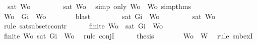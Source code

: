 \begin{isabellebody}
\ {\isachardoublequoteopen}{\isasymnot}\ {\isacharparenleft}sat\ Wo{\isacharprime}{\isacharparenright}{\isachardoublequoteclose}\isanewline
\ \ \ \ \ \ \isamarkupfalse%
\ {\isacartoucheopen}{\isasymnot}\ sat\ Wo{\isacartoucheclose}\ \isamarkupfalse%
\ {\isacharparenleft}simp\ only{\isacharcolon}\ {\isacartoucheopen}Wo\ {\isacharequal}\ Wo{\isacharprime}{\isacartoucheclose}\ simp{\isacharunderscore}thms{\isacharparenleft}{}{\isacharparenright}{\isacharparenright}\isanewline
\ \ \ \ \isamarkupfalse%
\ {\isachardoublequoteopen}Wo{\isacharprime}\ {\isasymsubseteq}\ {\isacharbraceleft}Gi{\isacharbraceright}\ {\isasymunion}\ Wo{\isacharprime}{\isachardoublequoteclose}\isanewline
\ \ \ \ \ \ \isamarkupfalse%
\ blast\isanewline
\ \ \ \ \isamarkupfalse%
\ \isamarkupfalse%
\ {\isachardoublequoteopen}{\isasymnot}\ {\isacharparenleft}sat\ {\isacharparenleft}{\isacharbraceleft}Gi{\isacharbraceright}\ {\isasymunion}\ Wo{\isacharprime}{\isacharparenright}{\isacharparenright}{\isachardoublequoteclose}\isanewline
\ \ \ \ \ \ \isamarkupfalse%
\ {\isacartoucheopen}{\isasymnot}\ {\isacharparenleft}sat\ Wo{\isacharprime}{\isacharparenright}{\isacartoucheclose}\ \isamarkupfalse%
\ {\isacharparenleft}rule\ sat{\isacharunderscore}subset{\isacharunderscore}ccontr{\isacharparenright}\isanewline
\ \ \ \ \isamarkupfalse%
\ {\isachardoublequoteopen}finite\ Wo{\isacharprime}\ {\isasymand}\ {\isasymnot}{\isacharparenleft}sat\ {\isacharparenleft}{\isacharbraceleft}Gi{\isacharbraceright}\ {\isasymunion}\ Wo{\isacharprime}{\isacharparenright}{\isacharparenright}{\isachardoublequoteclose}\isanewline
\ \ \ \ \ \ \isamarkupfalse%
\ {\isacartoucheopen}finite\ Wo{\isacharprime}{\isacartoucheclose}\ {\isacartoucheopen}{\isasymnot}{\isacharparenleft}sat\ {\isacharparenleft}{\isacharbraceleft}Gi{\isacharbraceright}\ {\isasymunion}\ Wo{\isacharprime}{\isacharparenright}{\isacharparenright}{\isacartoucheclose}\ \isamarkupfalse%
\ {\isacharparenleft}rule\ conjI{\isacharparenright}\isanewline
\ \ \ \ \isamarkupfalse%
\ {\isacharquery}thesis\isanewline
\ \ \ \ \ \ \isamarkupfalse%
\ {\isacartoucheopen}Wo{\isacharprime}\ {\isasymsubseteq}\ W{\isacartoucheclose}\ \isamarkupfalse%
\ {\isacharparenleft}rule\ subexI{\isacharparenright}\isanewline
\ \ \isamarkupfalse%
\isanewline
{}\isamarkupfalse%
%
\endisatagproof
{\isafoldproof}%
%
\isadelimproof

\end{isabellebody}
